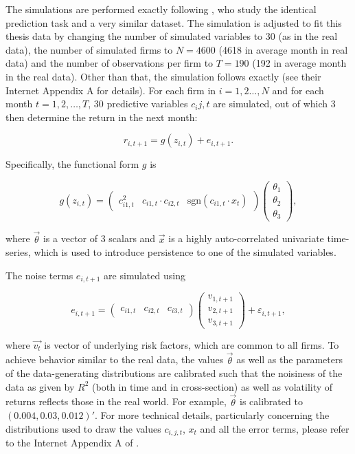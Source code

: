 		The simulations are performed exactly following \cite{gu2020empirical}, who study the identical prediction task and a very similar dataset. The simulation is adjusted to fit this thesis data by changing the number of simulated variables to 30 (as in the real data), the number of simulated firms to $N=4600$ (4618 in average month in real data) and the number of observations per firm to  $T=190$ (192 in average month in the real data). Other than that, the simulation follows exactly \cite{gu2020empirical} (see their Internet Appendix A for details). For each firm in $i=1, 2\dots,N$ and for each month $t=1, 2, \dots,T$, 30 predictive variables $c_ij,t$ are simulated, out of which 3 then determine the return in the next month:
		
		\begin{equation*}
			r_{i,{t+1}} = g(z_{i,t}) + e_{i,t+1}.
		\end{equation*}
		
		Specifically, the functional form $g$ is 
		
		\begin{equation*}
			g(z_{i,t}) = \begin{pmatrix}
			c_{i1,t}^2 & c_{i1,t}\cdot c_{i2,t} & \text{sgn}(c_{i1,t}\cdot x_t)
			\end{pmatrix} \begin{pmatrix}
			\theta_1 \\ \theta_2 \\ \theta_3
			\end{pmatrix}, 
		\end{equation*}
		
		where $\vec{\theta}$ is a vector of 3 scalars and $\vec{x}$ is a highly auto-correlated univariate time-series, which is used to introduce persistence to one of the simulated variables.   
		
		The noise terms $e_{i,t+1}$ are simulated using 
		
		\begin{equation*}
			e_{i,t+1} = \begin{pmatrix} c_{i1,t} & c_{i2,t} & c_{i3,t} \end{pmatrix} \begin{pmatrix} v_{1,t+1} \\ v_{2,t+1} \\ v_{3,t+1}  \end{pmatrix} + \varepsilon_{i,t+1},
		\end{equation*}  
		
		where $\vec{v_t}$ is vector of underlying risk factors, which are common to all firms. To achieve behavior similar to the real data, the values $\vec{\theta}$ as well as the parameters of the data-generating distributions are calibrated such that the noisiness of the data as given by $R^2$ (both in time and in cross-section) as well as volatility of returns reflects those in the real world. For example, $\vec{\theta}$ is calibrated to $(0.004, 0.03, 0.012)'$. For more technical details, particularly concerning the distributions used to draw the values $c_{i,j,t}$, $x_t$  and all the error terms, please refer to the Internet Appendix A of \cite{gu2020empirical}. 
		
		  
	
	
	
	
	
	
	
	
	
	
	
	
	
	